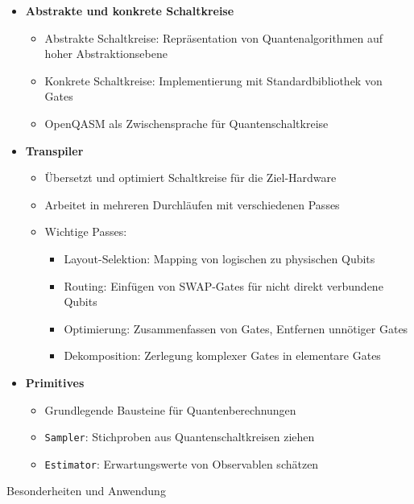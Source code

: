 \begin{itemize}
    \item \textbf{Abstrakte und konkrete Schaltkreise}
    \begin{itemize}
        \item Abstrakte Schaltkreise: Repräsentation von Quantenalgorithmen auf hoher Abstraktionsebene
        \item Konkrete Schaltkreise: Implementierung mit Standardbibliothek von Gates
        \item OpenQASM als Zwischensprache für Quantenschaltkreise
    \end{itemize}
    
    \item \textbf{Transpiler}
    \begin{itemize}
        \item Übersetzt und optimiert Schaltkreise für die Ziel-Hardware
        \item Arbeitet in mehreren Durchläufen mit verschiedenen Passes
        \item Wichtige Passes:
        \begin{itemize}
            \item Layout-Selektion: Mapping von logischen zu physischen Qubits
            \item Routing: Einfügen von SWAP-Gates für nicht direkt verbundene Qubits
            \item Optimierung: Zusammenfassen von Gates, Entfernen unnötiger Gates
            \item Dekomposition: Zerlegung komplexer Gates in elementare Gates
        \end{itemize}
    \end{itemize}
    
    \item \textbf{Primitives}
    \begin{itemize}
        \item Grundlegende Bausteine für Quantenberechnungen
        \item \texttt{Sampler}: Stichproben aus Quantenschaltkreisen ziehen
        \item \texttt{Estimator}: Erwartungswerte von Observablen schätzen
    \end{itemize}
\end{itemize}

Besonderheiten und Anwendung

